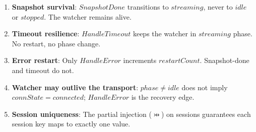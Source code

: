 \documentclass[a4paper,10pt,fleqn]{article}
\begin{document}
\begin{enumerate}
  \item \textbf{Snapshot survival}: $SnapshotDone$ transitions to
    $streaming$, never to $idle$ or $stopped$.  The watcher
    remains alive.

  \item \textbf{Timeout resilience}: $HandleTimeout$ keeps the
    watcher in $streaming$ phase.  No restart, no phase change.

  \item \textbf{Error restart}: Only $HandleError$ increments
    $restartCount$.  Snapshot-done and timeout do not.

  \item \textbf{Watcher may outlive the transport}: $phase \neq idle$
    does not imply $connState = connected$; $HandleError$ is the
    recovery edge.

  \item \textbf{Session uniqueness}: The partial injection
    ($\pinj$) on sessions guarantees each session key maps to
    exactly one value.
\end{enumerate}
\end{document}

